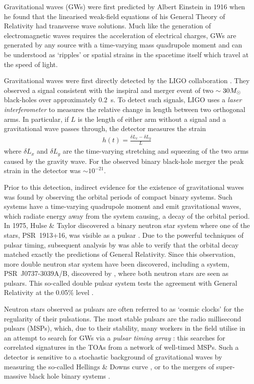 Gravitational waves (GWs) were first predicted by Albert Einstein in 1916
\citep{einstein1916approximative} when he found that the linearised weak-field
equations of his General Theory of Relativity had transverse wave solutions.
Much like the generation of electromagnetic waves requires the acceleration of
electrical charges, GWs are generated by any source with a
time-varying mass quadrupole moment and can be understood as `ripples' or
spatial strains in the spacetime itself which travel at the speed of light.

Gravitational waves were first directly detected by the LIGO collaboration
\citep{abbott2016observation}. They observed a signal consistent with the
inspiral and merger event of two $\sim 30 M_{\odot}$ black-holes over approximately
$0.2$~s. To detect such signals, LIGO uses a \emph{laser interferometer} to
measures the relative change in length between two orthogonal arms. In
particular, if $L$ is the length of either arm without a signal and a
gravitational wave passes through, the detector measures the strain
\begin{align}
h(t) = \frac{\delta L_x - \delta L_y}{L}
\end{align}
where $\delta L_x$ and $\delta L_y$ are the time-varying stretching and
squeezing of the two arms caused by the gravity wave. For the observed binary
black-hole merger the peak strain in the detector was $\sim 10^{-21}$.

Prior to this detection, indirect evidence for the existence of gravitational
waves was found by observing the orbital periods of compact binary systems.
Such systems have a time-varying quadrupole moment and emit gravitational
waves, which radiate energy away from the system causing, a decay of the orbital
period. In 1975, Hulse \& Taylor discovered a binary neutron star system where
one of the stars, PSR~1913+16, was visible as a pulsar \citep{Hulse1975}. Due to
the powerful techniques of pulsar timing, subsequent analysis by
\citet{Taylor1982} was able to verify that the orbital decay matched exactly
the predictions of General Relativity. Since this observation, more double
neutron star system have been discovered, including a system, PSR~J0737-3039A/B,
discovered by \citet{burgay2003increased}, where both neutron stars are seen as
pulsars. This so-called double pulsar system tests the agreement with General
Relativity at the 0.05\% level \citep{kramerstairs2006}.

Neutron stars observed as pulsars are often referred to as `cosmic clocks' for
the regularity of their pulsations. The most stable pulsars are the radio
millisecond pulsars (MSPs), which, due to their stability, many workers in the field
utilise in an attempt to search for GWs via a \emph{pulsar timing array}
\citep{hobbs2010international}: this searches for correlated signatures in the
TOAs from a network of well-timed MSPs. Such a detector is sensitive to a
stochastic background of gravitational waves by measuring the so-called
Hellings \& Downs curve \citep{hellings1983upper}, or to the mergers of
super-massive black hole binary systems \citep{lee2011gravitational}.

